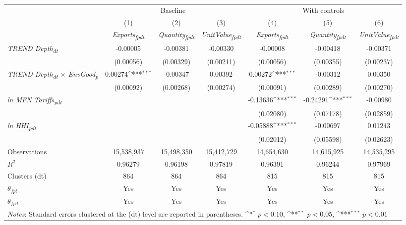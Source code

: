 {
\def\sym#1{\ifmmode^{#1}\else\(^{#1}\)\fi}
\begin{tabular}{l*{6}{c}}
\toprule
&\multicolumn{3}{c}{Baseline}&\multicolumn{3}{c}{With controls}\\\cmidrule(lr){2-4}\cmidrule(lr){5-7}
&(1)&(2)&(3)&(4)&(5)&(6)\\
&\textit{Exports\textsubscript{fpdt}}&\textit{Quantity\textsubscript{fpdt}}&\textit{UnitValue\textsubscript{fpdt}}&\textit{Exports\textsubscript{fpdt}}&\textit{Quantity\textsubscript{fpdt}}&\textit{UnitValue\textsubscript{fpdt}}\\
\midrule
\textit{TREND Depth\textsubscript{dt}} & -0.00005 & -0.00381 & -0.00330 & -0.00008 & -0.00418 & -0.00371\\
 & (0.00056) & (0.00329) & (0.00211) & (0.00056) & (0.00355) & (0.00237)\\
\addlinespace
\textit{TREND Depth\textsubscript{dt} $\times$ EnvGood\textsubscript{p}} & 0.00274\sym{***} & -0.00347 & 0.00392 & 0.00272\sym{***} & -0.00312 & 0.00350\\
 & (0.00092) & (0.00268) & (0.00274) & (0.00091) & (0.00289) & (0.00270)\\
\addlinespace
\textit{ln MFN Tariffs\textsubscript{pdt}} &  &  &  & -0.13636\sym{***} & -0.24291\sym{***} & -0.00980\\
 &  &  &  & (0.02080) & (0.07178) & (0.02859)\\
\addlinespace
\textit{ln HHI\textsubscript{pdt}} &  &  &  & -0.05888\sym{***} & -0.00697 & 0.01243\\
 &  &  &  & (0.02012) & (0.05598) & (0.02623)\\
\midrule
Observations & 15,538,937 & 15,498,350 & 15,412,729 & 14,654,630 & 14,615,925 & 14,535,295\\
$R^{2}$ & 0.96279 & 0.96198 & 0.97819 & 0.96391 & 0.96244 & 0.97969\\
Clusters (dt) & 864 & 864 & 864 & 815 & 815 & 815\\
$\theta_{fpt}$ & Yes & Yes & Yes & Yes & Yes & Yes\\
$\theta_{fpd}$ & Yes & Yes & Yes & Yes & Yes & Yes\\
\bottomrule
\multicolumn{7}{l}{\footnotesize \textit{Notes}: Standard errors clustered at the (dt) level are reported in parentheses. \sym{*} \(p<0.10\), \sym{**} \(p<0.05\), \sym{***} \(p<0.01\)}\\
\end{tabular}
}
